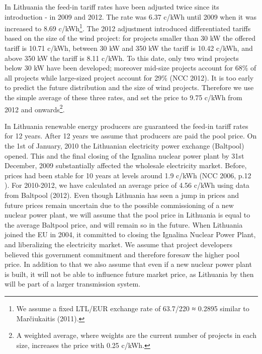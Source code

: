 \documentclass[a4paper, 12pt]{article}
\begin{document}
In Lithuania the feed-in tariff rates have been adjusted twice since its introduction - in 2009 and 2012. The rate was 6.37 c/kWh until 2009 when it was increased to 8.69 c/kWh\footnote{We assume a fixed LTL/EUR exchange rate of 63.7/220 ≈ 0.2895 similar to Marčiukaitis (2011).}. The 2012 adjustment introduced differentiated tariffs based on the size of the wind project: for projects smaller than 30 kW the offered tariff is 10.71 c/kWh, between 30 kW and 350 kW the tariff is 10.42 c/kWh, and above 350 kW the tariff is 8.11 c/kWh. To this date, only two wind projects below 30 kW have been developed; moreover mid-size projects account for 68\% of all projects while large-sized project account for 29\% (NCC 2012). It is too early to predict the future distribution and the size of wind projects. Therefore we use the simple average of these three rates, and set the price to 9.75 c/kWh from 2012 and onwards\footnote{A weighted average, where weights are the current number of projects in each size, increases the price with 0.25 c/kWh.}. 

In Lithuania renewable energy producers are guaranteed the feed-in tariff rates for 12 years. After 12 years we assume that producers are paid the pool price. On the 1st of January, 2010 the Lithuanian electricity power exchange (Baltpool) opened. This and the final closing of the Ignalina nuclear power plant by 31st December, 2009 substantially affected the wholesale electricity market. Before, prices had been stable for 10 years at levels around 1.9 c/kWh (NCC 2006, p.12 ). For 2010-2012, we have calculated an average price of 4.56 c/kWh using data from Baltpool (2012). Even though Lithuania has seen a jump in prices and future prices remain uncertain due to the possible commissioning of a new nuclear power plant, we will assume that the pool price in Lithuania is equal to the average Baltpool price, and will remain so in the future. When Lithuania joined the EU in 2004, it committed to closing the Ignalina Nuclear Power Plant, and liberalizing the electricity market. We assume that project developers believed this government commitment and therefore foresaw the higher pool price. In addition to that we also assume that even if a new nuclear power plant is built, it will not be able to influence future market price, as Lithuania by then will be part of a larger transmission system.
\end{document}
